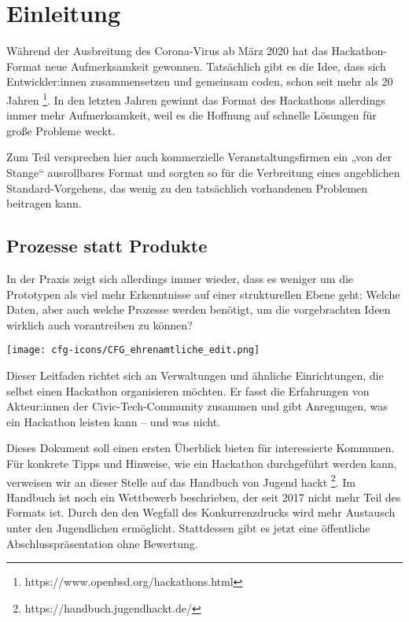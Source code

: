 

\setchapterpreamble[u]{\margintoc}
\chapter{Einleitung}


Während der Ausbreitung des Corona-Virus ab März 2020 hat das Ha\-cka\-thon-Format neue Aufmerksamkeit gewonnen. Tatsächlich gibt es die Idee, dass sich Entwickler:innen zusammensetzen und gemeinsam coden, schon seit mehr als 20 Jahren \footnote{https://www.openbsd.org/hackathons.html}. In den letzten Jahren gewinnt das Format des Hackathons allerdings immer mehr Aufmerksamkeit, weil es die Hoffnung auf schnelle Lösungen für große Probleme weckt.

Zum Teil versprechen hier auch kommerzielle Veranstaltungsfirmen ein „von der Stange“ ausrollbares Format und sorgten so für die Verbreitung eines angeblichen Standard-Vorgehens, das wenig zu den tatsächlich vorhandenen Problemen beitragen kann.

\section*{Prozesse statt Produkte}

In der Praxis zeigt sich allerdings immer wieder, dass es weniger um die Prototypen als viel mehr Erkenntnisse auf einer strukturellen Ebene geht: Welche Daten, aber auch welche Prozesse werden benötigt, um die vorgebrachten Ideen wirklich auch vorantreiben zu können?

\begin{marginfigure}[-0.5cm]
	\texttt{[image: cfg-icons/CFG\_ehrenamtliche\_edit.png]}
\end{marginfigure}

Dieser Leitfaden richtet sich an Verwaltungen und ähnliche Einrichtungen, die selbst einen Hackathon organisieren möchten. Er fasst die Erfahrungen von Akteur:innen der Civic-Tech-Community zusammen und gibt Anregungen, was ein Hackathon leisten kann – und was nicht.

Dieses Dokument soll einen ersten Überblick bieten für interessierte Kommunen. Für konkrete Tipps und Hinweise, wie ein Hackathon durchgeführt werden kann, verweisen wir an dieser Stelle auf das Handbuch von Jugend hackt \footnote{https://handbuch.jugendhackt.de/}. Im Handbuch ist noch ein Wettbewerb beschrieben, der seit 2017 nicht mehr Teil des Formats ist. Durch den den Wegfall des Konkurrenzdrucks wird mehr Austausch unter den Jugendlichen ermöglicht. Stattdessen gibt es jetzt eine öffentliche Abschlusspräsentation ohne Bewertung.

